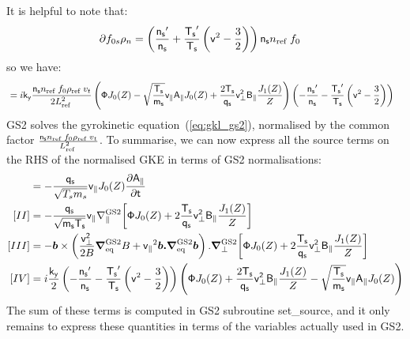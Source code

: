 \documentclass[10pt,a4paper]{article}
\newcommand{\dd}{\partial}
\newcommand{\pd}[2]{\frac{\partial{#1}}{\partial{#2}} }
\newcommand{\bfm}[1]{\mbox{{\boldmath $ { #1}$}}}
\newcommand{\ggp}{\nabla_{\parallel}^{\rm GS2}}
\newcommand{\gradeq}{\bfm{\nabla}^{\rm GS2}_{\rm eq}}
\newcommand{\gperp}{\bfm{\nabla}^{\rm GS2}_{\perp}}
\newcommand{\n}[1]{{#1}_{\rm ref\;}}
\newcommand{\g}[1]{\mathsf{#1}}
\begin{document}
It is helpful to note that:
\begin{align*}
  \dd{f_{0s}}{\rho_n} & = \left( \frac{\g{n_s}^{\prime}}{\g{n_s}} +
    \frac{\g{T_s}^{\prime}}{\g{T_s}} \left( \g{v}^2 - \frac{3}{2} \right)
  \right) \g{n_s} \n{n} f_0
\end{align*}
so we have:
\begin{align*}
  [IV] & = i \g{k_y} \frac{ \g{n_s} \n{n} f_0 \n{\rho} v_t}{2 \n{L}^2} \left(
    \g{\Phi} J_0(Z) - \sqrt{\frac{\g{T_s}}{\g{m_s}}} \g{v_{\parallel}}
    \g{A_{\parallel}} J_0(Z) + \frac{2 \g{T_s}}{\g{q_s}} \g{v_{\perp}^2}
    \g{B_{\parallel}} \frac{J_1(Z)}{Z} \right) \left(
    -\frac{\g{n_s}^{\prime}}{\g{n_s}} - \frac{\g{T_s}^{\prime}}{\g{T_s}}
    \left( \g{v}^2 - \frac{3}{2} \right) \right)
\end{align*}
GS2 solves the gyrokinetic equation~(\ref{eq:gkl_gs2}), normalised by the
common factor $\frac{\g{n_s} \n{n} f_0 \n{\rho} v_t}{\n{L}^2}$.  To summarise,
we can now express all the source terms on the RHS of the normalised GKE in
terms of GS2 normalisations:
\begin{align}
  [I] & = - \frac{\g{q_s}}{\sqrt{T_s m_s}} \g{v_{\parallel}} J_0(Z)
  \pd{\g{A_{\parallel}}}{\g{t}} \\
  [II] & = - \frac{\g{q_s}}{\sqrt{\g{m_s}\g{T_s}}} \g{v_{\parallel}}
  \ggp{\left[ \g{\Phi} J_0(Z) + 2 \frac{\g{T_s}}{\g{q_s}} \g{v_{\perp}^2}
      \g{B_{\parallel}} \frac{J_1(Z)}{Z} \right]} \\
  [III] & = - \bfm{b} \times \left( \frac{\g{v_{\perp}^2}}{2B} \gradeq{B} +
    \g{v_{\parallel}}^2 \bfm{b.}\gradeq \bfm{b} \right).\gperp { \left[
      \g{\Phi} J_0(Z) + 2 \frac{\g{T_s}}{\g{q_s}} \g{v_{\perp}^2}
      \g{B_{\parallel}} \frac{J_1(Z)}{Z} \right]} \\
  [IV] & = i \frac{\g{k_y}}{2} \left( -\frac{\g{n_s}^{\prime}}{\g{n_s}} -
    \frac{\g{T_s}^{\prime}}{\g{T_s}} \left( \g{v}^2 - \frac{3}{2} \right)
  \right) \left( \g{\Phi} J_0(Z) + \frac{2 \g{T_s}}{\g{q_s}} \g{v_{\perp}^2}
    \g{B_{\parallel}} \frac{J_1(Z)}{Z} - \sqrt{\frac{\g{T_s}}{\g{m_s}}}
    \g{v_{\parallel}} \g{A_{\parallel}} J_0(Z) \right)
\end{align}
The sum of these terms is computed in GS2 subroutine set\_source, and it only
remains to express these quantities in terms of the variables actually used in
GS2.
\end{document}

